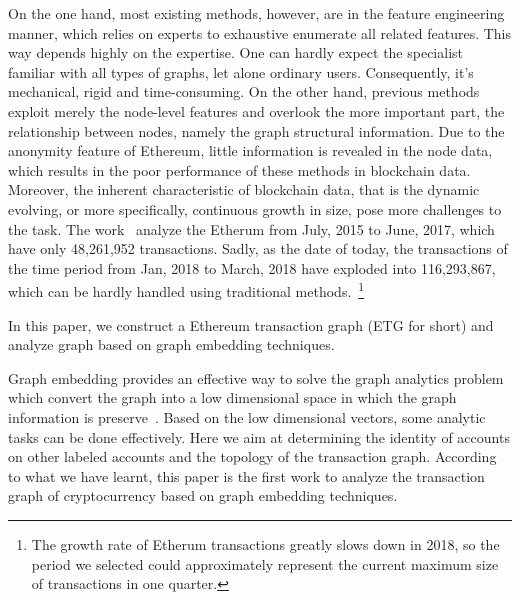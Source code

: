 On the one hand, most existing methods, however, are in the feature engineering manner, which relies on experts to exhaustive enumerate all related features. This way depends highly on the expertise. One can hardly expect the specialist familiar with all types of graphs, let alone ordinary users. Consequently, it's mechanical, rigid and time-consuming. On the other hand, previous methods exploit merely the node-level features and overlook the more important part, the relationship between nodes, namely the graph structural information. Due to the anonymity feature of Ethereum, little information is revealed in the node data, which results in the poor performance of these methods in blockchain data. Moreover, the inherent characteristic of blockchain data, that is the dynamic evolving, or more specifically, continuous growth in size, pose more challenges to the task. The work~\cite{chen2018infocom} analyze the Etherum from July, 2015 to June, 2017, which have only 48,261,952 transactions. Sadly, as the date of today, the transactions of the time period from Jan, 2018 to March, 2018 have exploded into 116,293,867, which can be hardly handled using traditional methods.~\footnote{The growth rate of Etherum transactions greatly slows down in 2018, so the period we selected could approximately represent the current maximum size of transactions in one quarter.} 




 In this paper, we construct a Ethereum transaction graph (ETG for short) and analyze graph based on graph embedding techniques.

 Graph embedding provides an effective way to solve the graph analytics problem which convert the graph into a low dimensional space in which the graph information is preserve~\cite{cai2018comprehensive}. Based on the low dimensional vectors, some analytic tasks can be done effectively. Here we aim at determining the identity of accounts on other labeled accounts and the topology of the transaction graph. According to what we have learnt, this paper is the first work to analyze the transaction graph of cryptocurrency based on graph embedding techniques.

